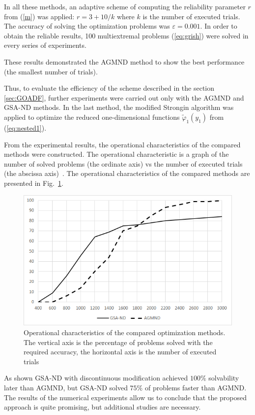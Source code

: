 \documentclass[runningheads]{llncs}
\begin{document}
In all these methods, an adaptive scheme of computing the reliability parameter $r$ from (\ref{m}) was applied: $r=3+10/k$ where $k$ is the number of executed trials. The accuracy of solving the optimization problems was $\varepsilon = 0.001$. In order to obtain the reliable
results, 100 multiextremal problems (\ref{eq:grish}) were solved in every series of experiments.

These results demonstrated the AGMND method to show the best performance (the smallest number of trials).

Thus, to evaluate the efficiency of the scheme described in the section \ref{sec:GOADF}, further experiments were carried out only with the AGMND and GSA-ND methods. In the last method, the modified Strongin algorithm was applied to optimize the reduced one-dimensional functions $\widetilde{\varphi}_1(y_1)$ from (\ref{eq:nested1}).

From the experimental results, the operational characteristics of the compared methods were constructed. The operational characteristic is a graph of the number of solved problems (the ordinate axis) vs the number of executed trials (the abscissa axis)~\cite{Strongin1978,Strongin2000,Strongin2013}. The operational characteristics of the compared methods are presented in Fig.~\ref{fig1}.

\begin{figure}
	\centering
	\includegraphics[width=0.75\linewidth]{fig1.png}
	\caption{Operational characteristics of the compared optimization methods. The vertical axis is the percentage of problems solved with the required accuracy, the horizontal axis is the number of executed trials} \label{fig1}
\end{figure} 

As shown GSA-ND with discontinuous modification achieved $100\%$ solvability later than AGMND, but GSA-ND solved $75\%$ of problems faster than AGMND. The results of the numerical experiments allow us to conclude that the proposed approach is quite promising, but additional studies are necessary.
\end{document}
